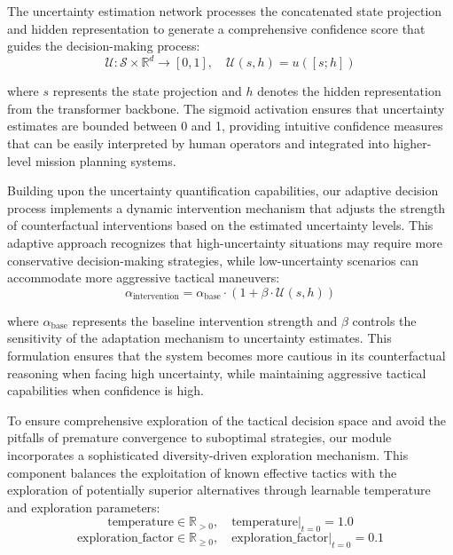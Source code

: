 \documentclass[12pt]{article}
\begin{document}
The uncertainty estimation network processes the concatenated state projection and hidden representation to generate a comprehensive confidence score that guides the decision-making process:
\begin{equation}
\mathcal{U}:\mathcal{S}\times\mathbb{R}^{d}\to[0,1],\quad \mathcal{U}(s,h)=u([s;h])
\end{equation}

where $s$ represents the state projection and $h$ denotes the hidden representation from the transformer backbone. The sigmoid activation ensures that uncertainty estimates are bounded between 0 and 1, providing intuitive confidence measures that can be easily interpreted by human operators and integrated into higher-level mission planning systems.

Building upon the uncertainty quantification capabilities, our adaptive decision process implements a dynamic intervention mechanism that adjusts the strength of counterfactual interventions based on the estimated uncertainty levels. This adaptive approach recognizes that high-uncertainty situations may require more conservative decision-making strategies, while low-uncertainty scenarios can accommodate more aggressive tactical maneuvers:
\begin{equation}
\alpha_{\text{intervention}} = \alpha_{\text{base}} \cdot (1 + \beta \cdot \mathcal{U}(s, h))
\end{equation}

where $\alpha_{\text{base}}$ represents the baseline intervention strength and $\beta$ controls the sensitivity of the adaptation mechanism to uncertainty estimates. This formulation ensures that the system becomes more cautious in its counterfactual reasoning when facing high uncertainty, while maintaining aggressive tactical capabilities when confidence is high.

To ensure comprehensive exploration of the tactical decision space and avoid the pitfalls of premature convergence to suboptimal strategies, our module incorporates a sophisticated diversity-driven exploration mechanism. This component balances the exploitation of known effective tactics with the exploration of potentially superior alternatives through learnable temperature and exploration parameters:
\begin{equation}
\mathrm{temperature}\in\mathbb{R}_{>0},\quad \mathrm{temperature}\big|_{t=0}=1.0
\end{equation}
\begin{equation}
\mathrm{exploration\_factor}\in\mathbb{R}_{\ge 0},\quad \mathrm{exploration\_factor}\big|_{t=0}=0.1
\end{equation}
\end{document}
